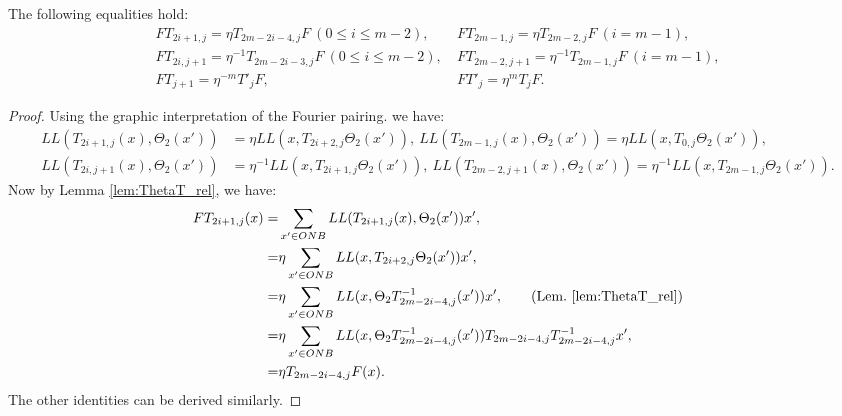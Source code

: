 \documentclass{amsart}
\begin{document}
\begin{prop} \label{prop:FT_rels}
The following equalities hold:
\begin{align}
FT_{2i+1,j}=\eta T_{2m-2i-4,j}F\  (0\leq i\leq m-2),\ 
&FT_{2m-1,j}=\eta T_{2m-2,j}F\ (i=m-1),\\ 
FT_{2i,j+1}=\eta^{-1}T_{2m-2i-3,j}F\  (0\leq i\leq m-2),\ 
&FT_{2m-2,j+1}=\eta^{-1}T_{2m-1,j}F\ (i=m-1),\\
FT_{j+1}=\eta^{-m}T'_jF,\ &FT'_j=\eta^m T_{j}F.
\end{align}
\end{prop}
\begin{proof}
Using the graphic interpretation of the Fourier pairing. we have:
\[
\begin{aligned}
 LL(T_{2i+1,j}(x),\Theta_2(x'))&=\eta LL(x,T_{2i+2,j}\Theta_2(x')),\ LL(T_{2m-1,j}(x),\Theta_2(x'))=\eta LL(x,T_{0,j}\Theta_2(x')),\\
  LL(T_{2i,j+1}(x),\Theta_2(x'))&=\eta^{-1}LL(x,T_{2i+1,j}\Theta_2(x')),\ LL(T_{2m-2,j+1}(x),\Theta_2(x'))=\eta^{-1}LL(x,T_{2m-1,j}\Theta_2(x')).
 \end{aligned}
 \]
Now by Lemma \ref{lem:ThetaT_rel}, we have: 
\[
\begin{aligned}
FT_{2i+1,j}(x)=&\sum_{x'\in ONB}LL(T_{2i+1,j}(x),\Theta_2(x'))x',\\
=&\eta\sum_{x'\in ONB}LL(x,T_{2i+2,j}\Theta_2(x'))x',\\
=&\eta\sum_{x'\in ONB}LL(x,\Theta_2T^{-1}_{2m-2i-4,j}(x'))x',\qquad (\text{Lem.~\ref{lem:ThetaT_rel}})\\
=&\eta\sum_{x'\in ONB}LL(x,\Theta_2T^{-1}_{2m-2i-4,j}(x'))T_{2m-2i-4,j}T^{-1}_{2m-2i-4,j}x',\\
=&\eta T_{2m-2i-4,j}F(x).   
\end{aligned}
\]
The other identities can be derived similarly.
\end{proof}   
\end{document}
